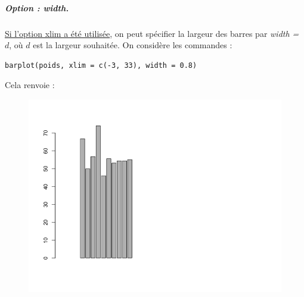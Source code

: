 \subparagraph{Option : width. } \underline{Si l'option xlim a été utilisée}, on peut spécifier la largeur des barres par \textit{width = $d$}, où $d$ est la largeur souhaitée.\newline
On considère les commandes :
\begin{lstlisting}[language=html]
barplot(poids, xlim = c(-3, 33), width = 0.8)
\end{lstlisting}
Cela renvoie :
\begin{figure}[H]\begin{center}\includegraphics[scale=0.4]{ilu/gra36.png}\end{center}\end{figure}

